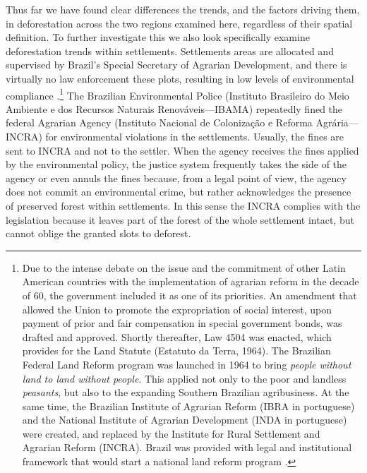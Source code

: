 Thus far we have found clear differences the trends, and the factors driving them, in deforestation across the two regions examined here, regardless of their spatial definition.  To further investigate this we also look specifically examine deforestation trends within settlements. Settlements areas are allocated and supervised by Brazil’s Special Secretary of Agrarian Development, and there is virtually no law enforcement these plots, resulting in low levels of environmental compliance \citep{PERES2}.\footnote{Due to the intense debate on the issue and the commitment of other Latin American countries with the implementation of agrarian reform in the decade of 60, the government included it as one of its priorities. An amendment that allowed the Union to promote the expropriation of social interest, upon payment of prior and fair compensation in special government bonds, was drafted and approved. Shortly thereafter, Law 4504 was enacted, which provides for the Land Statute (Estatuto da Terra, 1964). The Brazilian Federal Land Reform program was launched in 1964  to bring \textit{people without land to land without people}. This applied not only to the poor and landless \textit{peasants}, but also to the expanding Southern Brazilian agribusiness. At the same time, the Brazilian Institute of Agrarian Reform (IBRA in portuguese) and the National Institute of Agrarian Development (INDA in portuguese) were created, and replaced by the Institute for Rural Settlement and Agrarian Reform (INCRA). Brazil was provided with legal and institutional framework that would start a national land reform program \citep{ESPADA}.} The Brazilian Environmental Police (Instituto Brasileiro do Meio Ambiente e dos Recursos Naturais Renováveis—IBAMA) repeatedly fined the federal Agrarian Agency (Instituto Nacional de Colonização e Reforma Agrária—INCRA) for environmental violations in the settlements. Usually, the fines are sent to INCRA and not to the settler. When the agency receives the fines applied by the environmental policy, the justice system frequently takes the side of the agency or even annuls the fines because, from a legal point of view, the agency does not commit an environmental crime, but rather acknowledges the presence of preserved forest within settlements. In this sense the INCRA complies with the legislation because it leaves part of the forest of the whole settlement intact, but cannot oblige the granted slots to deforest. 

